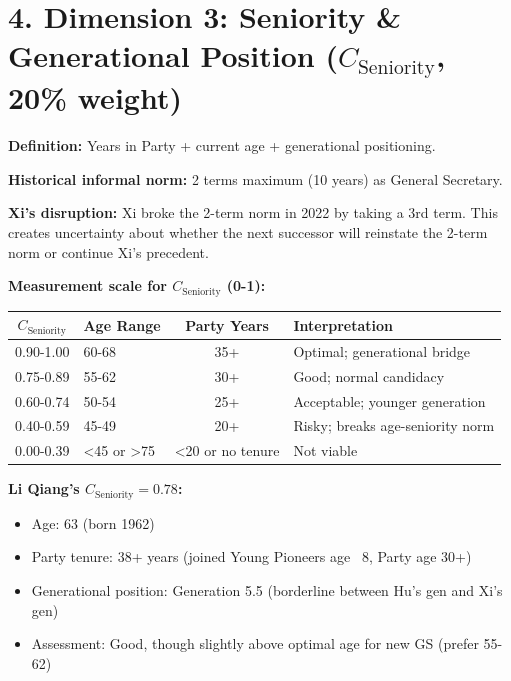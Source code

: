 \documentclass[11pt]{article}
\begin{document}
\section{4. Dimension 3: Seniority \& Generational Position ($C_{\text{Seniority}}$, 20\% weight)}

\textbf{Definition:} Years in Party + current age + generational positioning.

\textbf{Historical informal norm:} 2 terms maximum (10 years) as General Secretary.

\textbf{Xi's disruption:} Xi broke the 2-term norm in 2022 by taking a 3rd term. This creates uncertainty about whether the next successor will reinstate the 2-term norm or continue Xi's precedent.

\textbf{Measurement scale for $C_{\text{Seniority}}$ (0-1):}

\begin{table}[h]
\centering
\begin{tabular}{|c|l|c|l|}
\hline
$C_{\text{Seniority}}$ & \textbf{Age Range} & \textbf{Party Years} & \textbf{Interpretation} \\
\hline
0.90-1.00 & 60-68 & 35+ & Optimal; generational bridge \\
0.75-0.89 & 55-62 & 30+ & Good; normal candidacy \\
0.60-0.74 & 50-54 & 25+ & Acceptable; younger generation \\
0.40-0.59 & 45-49 & 20+ & Risky; breaks age-seniority norm \\
0.00-0.39 & <45 or >75 & <20 or no tenure & Not viable \\
\hline
\end{tabular}
\end{table}

\textbf{Li Qiang's $C_{\text{Seniority}} = 0.78$:}
\begin{itemize}
\item Age: 63 (born 1962)
\item Party tenure: 38+ years (joined Young Pioneers age ~8, Party age 30+)
\item Generational position: Generation 5.5 (borderline between Hu's gen and Xi's gen)
\item Assessment: Good, though slightly above optimal age for new GS (prefer 55-62)
\end{itemize}

\end{document}

